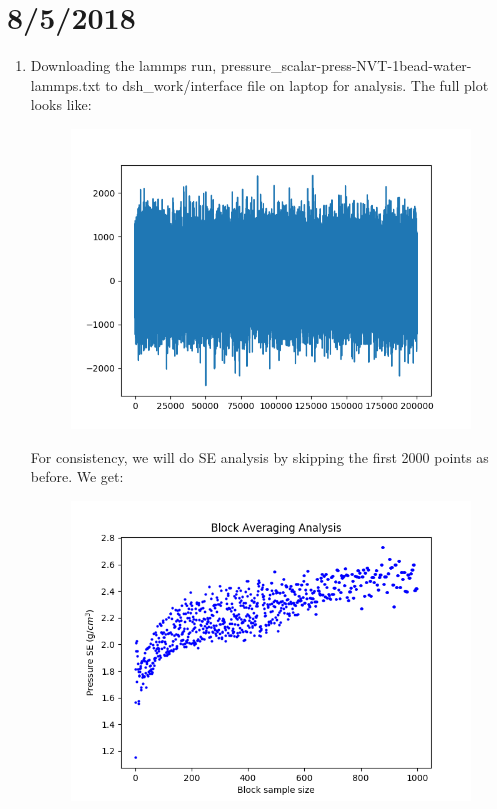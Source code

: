 \documentclass[12pt,reqno]{amsart}
\numberwithin{equation}{section}
\begin{document}
\section{8/5/2018}
\begin{enumerate}
\item Downloading the lammps run, pressure\_scalar-press-NVT-1bead-water-lammps.txt to dsh\_work/interface file on laptop for analysis.  The full plot looks like:
\begin{figure}[H]
\centering
\includegraphics[scale=0.6]{pressures_press-NVT-1bead-water-lammps-full}
\end{figure}
For consistency, we will do SE analysis by skipping the first 2000 points as before.  We get: 
\begin{figure}[H]
\centering
\includegraphics[scale=0.6]{pressure_block_averaging_press-NVT-1bead-water-lammps}

\end{figure}
\end{enumerate}
\end{document}
